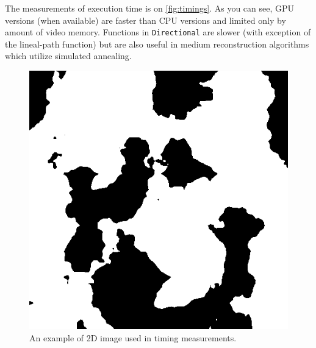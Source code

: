 \documentclass[reprint,amsmath,amssymb,aps,pre,showkeys,showpacs,nofootinbib]{revtex4-1}
\newcommand{\code}[1]{\colorbox{light-gray}{\texttt{#1}}}
\begin{document}
The measurements of execution time is on \cref{fig:timings}. As you can see, GPU
versions (when available) are faster than CPU versions and limited only by
amount of video memory. Functions in \code{Directional} are slower (with
exception of the lineal-path function) but are also useful in medium
reconstruction algorithms which utilize simulated annealing.

\begin{figure}[ht]
  \centering
  \includegraphics[width=0.9\linewidth]{images/timing-image.png}
  \caption[]{An example of 2D image used in timing measurements.}
  \label{fig:valuenoise}
\end{figure}
\end{document}
